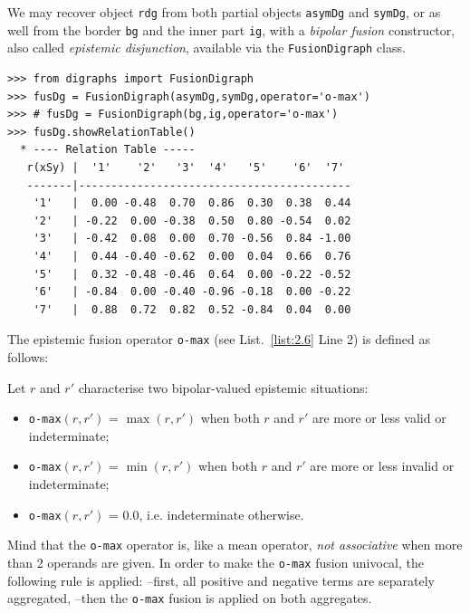 We may recover object \texttt{rdg} from both partial objects \texttt{asymDg} and \texttt{symDg}, or as well from the border \texttt{bg} and the inner part \texttt{ig}, with a \emph{bipolar fusion} constructor, also called \emph{epistemic disjunction}, available via the \texttt{FusionDigraph} class. 
\begin{lstlisting}[caption={Epistemic fusion of partial diagraphs},label=list:2.6]
>>> from digraphs import FusionDigraph
>>> fusDg = FusionDigraph(asymDg,symDg,operator='o-max')
>>> # fusDg = FusionDigraph(bg,ig,operator='o-max')
>>> fusDg.showRelationTable()
  * ---- Relation Table -----
   r(xSy) |  '1'    '2'   '3'  '4'   '5'    '6'  '7'	  
   -------|------------------------------------------
    '1'   |  0.00 -0.48  0.70  0.86  0.30  0.38  0.44	 
    '2'   | -0.22  0.00 -0.38  0.50  0.80 -0.54  0.02	 
    '3'   | -0.42  0.08  0.00  0.70 -0.56  0.84 -1.00	 
    '4'   |  0.44 -0.40 -0.62  0.00  0.04  0.66  0.76	 
    '5'   |  0.32 -0.48 -0.46  0.64  0.00 -0.22 -0.52	 
    '6'   | -0.84  0.00 -0.40 -0.96 -0.18  0.00 -0.22	 
    '7'   |  0.88  0.72  0.82  0.52 -0.84  0.04  0.00
\end{lstlisting}

The epistemic fusion operator \texttt{o-max} (see List.~\vref{list:2.6} Line 2) is defined as follows:
\begin{definition}\label{def:disjunctiveFusion}

\noindent Let $r$ and $r'$ characterise two bipolar-valued epistemic situations:
\begin{itemize}[leftmargin=0.5cm,rightmargin=0.5cm,nosep]
\item \texttt{o-max}$(r, r')$ = $\max(r, r' )$ when both $r$ and $r'$ are more or less valid or indeterminate;
\item \texttt{o-max}$(r, r')$ = $\min(r, r' )$ when both $r$ and $r'$ are more or less invalid or indeterminate;
\item \texttt{o-max}$(r, r')$ = $0.0$, i.e. indeterminate otherwise.
\end{itemize}
\end{definition}

Mind that the \texttt{o-max} operator is, like a mean operator, \emph{not associative} when more than 2 operands are given. In order to make the \texttt{o-max} fusion univocal, the following rule is applied: --first, all positive and negative terms are separately aggregated, --then the \texttt{o-max} fusion is applied on both aggregates.

